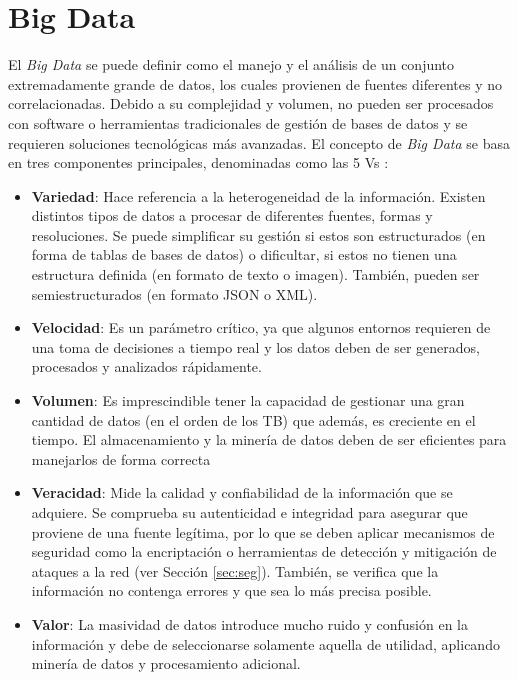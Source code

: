 \section{Big Data}
\label{sec:bigdata}


El \textit{Big Data} \cite{stab} se puede definir como el manejo y el análisis de un conjunto extremadamente grande de datos, los cuales provienen de fuentes diferentes y no correlacionadas. Debido a su complejidad y volumen, no pueden ser procesados con software o herramientas tradicionales de gestión de bases de datos y se requieren soluciones tecnológicas más avanzadas. El concepto de \textit{Big Data} se basa en tres componentes principales, denominadas como las 5 Vs \cite{5vs} \cite{5vs2}:

\begin{itemize}
    \item \textbf{Variedad}: Hace referencia a la heterogeneidad de la información. Existen distintos tipos de datos a procesar de diferentes fuentes, formas y resoluciones. Se puede simplificar su gestión si estos son estructurados (en forma de tablas de bases de datos) o dificultar, si estos no tienen una estructura definida (en formato de texto o imagen). También, pueden ser semiestructurados (en formato JSON o XML).
    \item \textbf{Velocidad}: Es un parámetro crítico, ya que algunos entornos requieren de una toma de decisiones a tiempo real y los datos deben de ser generados, procesados y analizados rápidamente. 
    \item \textbf{Volumen}: Es imprescindible tener la capacidad de gestionar una gran cantidad de datos (en el orden de los TB) que además, es creciente en el tiempo. El almacenamiento y la minería de datos deben de ser eficientes para manejarlos de forma correcta 
    \item \textbf{Veracidad}: Mide la calidad y confiabilidad de la información que se adquiere. Se comprueba su autenticidad e integridad para asegurar que proviene de una fuente legítima, por lo que se deben aplicar mecanismos de seguridad como la encriptación o herramientas de detección y mitigación de ataques a la red (ver Sección \ref{sec:seg}). También, se verifica que la información no contenga errores y que sea lo más precisa posible.
    \item \textbf{Valor}: La masividad de datos introduce mucho ruido y confusión en la información y debe de seleccionarse solamente aquella de utilidad, aplicando minería de datos y procesamiento adicional.
\end{itemize}

